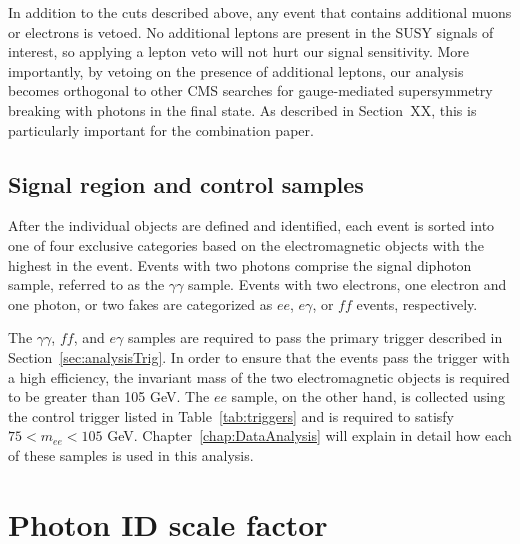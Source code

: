 In addition to the cuts described above, any event that contains additional muons or electrons is vetoed. 
No additional leptons are present in the SUSY signals of interest, so applying a lepton veto will not hurt our signal sensitivity.
More importantly, by vetoing on the presence of additional leptons, our analysis becomes orthogonal to other CMS searches for
gauge-mediated supersymmetry breaking with photons in the final state. As described in Section~XX, this is particularly
important for the combination paper.

\subsection{Signal region and control samples}
\label{sec:samples}
After the individual objects are defined and identified, each event is sorted into one of four exclusive categories based on the electromagnetic objects with the highest \pT in the event. Events with two photons comprise the signal diphoton sample, referred to as the $\gamma\gamma$ sample. Events with two electrons, one electron and one photon, or two fakes are categorized as $ee$, $e\gamma$, or $ff$ events, respectively. 

The  $\gamma\gamma$, $ff$, and $e\gamma$ samples are required to pass the primary trigger described in Section~\ref{sec:analysisTrig}. 
In order to ensure that the events pass the trigger with a high efficiency, the invariant mass of the two electromagnetic objects is required to be greater than 105 GeV. 
The $ee$ sample, on the other hand, is collected using the control trigger listed in Table~\ref{tab:triggers} and is required to satisfy $75 < m_{ee} < 105$ GeV. Chapter~\ref{chap:DataAnalysis} will explain in detail how each of these samples is used in this analysis.


\section{Photon ID scale factor}
\label{sec:phoSF}

